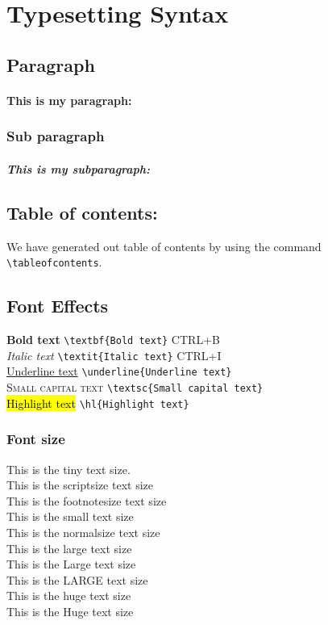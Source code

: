 \section{Typesetting Syntax}
\label{sec:typesetting_syntax}

\subsection{Paragraph}
\label{subsec:paragraph}
\paragraph{This is my paragraph:} \lipsum[1]

\subsubsection{Sub paragraph}

\subparagraph{This is my subparagraph:} \lipsum[1]

\subsection{Table of contents:} We have generated out table of contents by using the command \verb|\tableofcontents|.

\subsection{Font Effects}
\textbf{Bold text} \verb|\textbf{Bold text}| CTRL+B\\
\textit{Italic text} \verb|\textit{Italic text}| CTRL+I\\
\underline{Underline text} \verb|\underline{Underline text}|\\
\textsc{Small capital text} \verb|\textsc{Small capital text}|\\
\hl{Highlight text} \verb|\hl{Highlight text}|\\
\subsubsection{Font size}

{\tiny 			This is the tiny text size.}\\ %
{\scriptsize 	This is the scriptsize text size}\\
{\footnotesize 	This is the footnotesize text size}\\
{\small 		This is the small text size} \\
{\normalsize 	This is the normalsize text size}\\
{\large 		This is the large text size}\\
{\Large 		This is the Large text size}\\
{\LARGE 		This is the LARGE text size} \\
{\huge 			This is the huge text size}\\
{\Huge 			This is the Huge text size}

